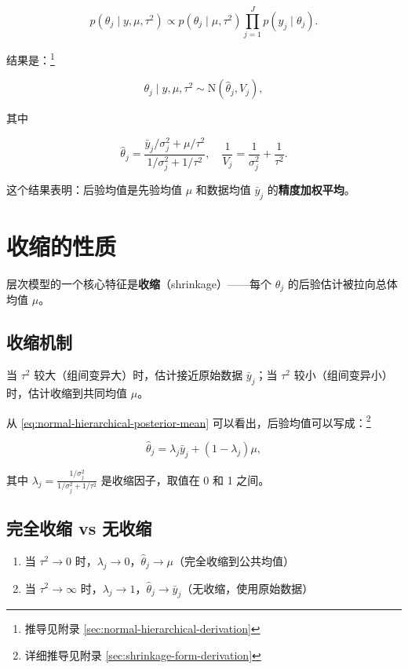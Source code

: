 \[
p(\theta_j \mid y, \mu, \tau^2) \propto p(\theta_j \mid \mu, \tau^2) \prod_{j=1}^{J} p(y_j \mid \theta_j).
\]

结果是：\footnote{推导见附录 \cref{sec:normal-hierarchical-derivation}}

\[
\theta_j \mid y, \mu, \tau^2 \sim \mathrm{N}\left( \hat{\theta}_j, V_j \right), \label{eq:normal-hierarchical-posterior}
\]

其中

\[
\hat{\theta}_j = \frac{\bar{y}_j/\sigma_j^2 + \mu/\tau^2}{1/\sigma_j^2 + 1/\tau^2}, \quad \frac{1}{V_j} = \frac{1}{\sigma_j^2} + \frac{1}{\tau^2}. \label{eq:normal-hierarchical-posterior-mean}
\]

这个结果表明：后验均值是先验均值 $\mu$ 和数据均值 $\bar{y}_j$ 的\textbf{精度加权平均}。

\section{收缩的性质}\label{sec:shrinkage-benefits}

层次模型的一个核心特征是\textbf{收缩}（shrinkage）——每个 $\theta_j$ 的后验估计被拉向总体均值 $\mu$。

\subsection{收缩机制}

当 $\tau^2$ 较大（组间变异大）时，估计接近原始数据 $\bar{y}_j$；当 $\tau^2$ 较小（组间变异小）时，估计收缩到共同均值 $\mu$。

从 \eqref{eq:normal-hierarchical-posterior-mean} 可以看出，后验均值可以写成：\footnote{详细推导见附录 \cref{sec:shrinkage-form-derivation}}

\[
\hat{\theta}_j = \lambda_j \bar{y}_j + (1 - \lambda_j) \mu, \label{eq:shrinkage-form}
\]

其中 $\lambda_j = \frac{1/\sigma_j^2}{1/\sigma_j^2 + 1/\tau^2}$ 是收缩因子，取值在 0 和 1 之间。

\subsection{完全收缩 vs 无收缩}

\begin{enumerate}
  \item 当 $\tau^2 \to 0$ 时，$\lambda_j \to 0$，$\hat{\theta}_j \to \mu$（完全收缩到公共均值）
  \item 当 $\tau^2 \to \infty$ 时，$\lambda_j \to 1$，$\hat{\theta}_j \to \bar{y}_j$（无收缩，使用原始数据）
\end{enumerate}

